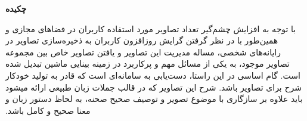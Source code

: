 \begin{center}
\textbf{چکیده}
\end{center}
‫با توجه به افزایش چشم‌گیر تعداد تصاویر مورد استفاده کاربران در فضاهای مجازی و همین‌طور با در نظر گرفتن گرایش روزافزون کاربران به ذخیره‌سازی تصاویر در رایانه‌های شخصی، مساله مدیریت این تصاویر و یافتن تصاویر خاص بین مجموعه تصاویر موجود، به یکی از مسائل مهم و پرکاربرد در زمینه بینایی ماشین تبدیل شده‌ است. گام اساسی در این راستا، دست‌یابی به سامانه‌ای است که قادر به تولید خودکار شرح برای تصاویر باشد. شرح این تصاویر که در قالب جملات زبان طبیعی ارائه می­شود باید علاوه بر سازگاری با موضوع تصویر و توصیف صحیح صحنه، به لحاظ دستور زبان و معنا صحیح و کامل باشد. 